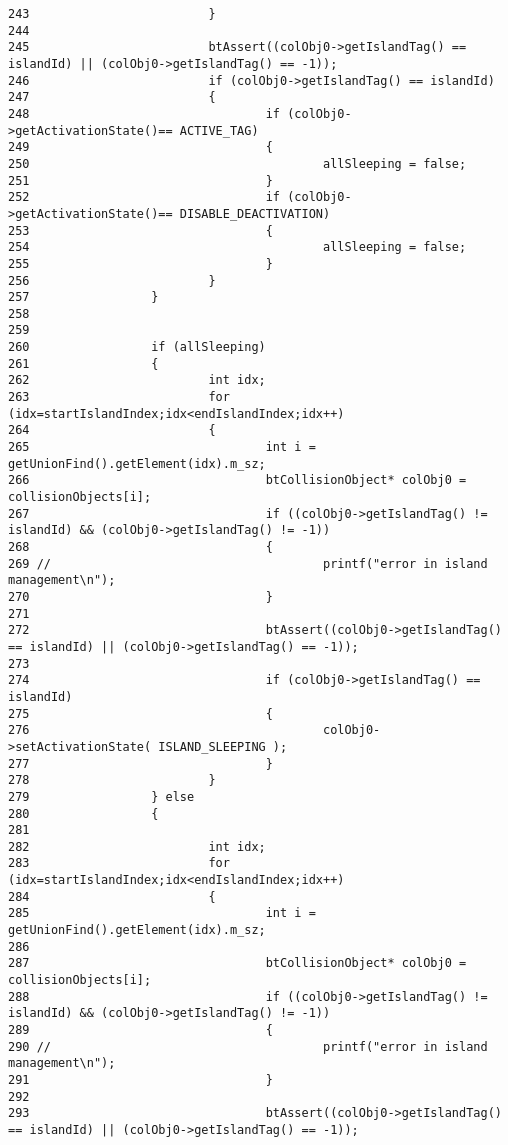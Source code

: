 \begin{Code}
\begin{verbatim}
243                         }
244 
245                         btAssert((colObj0->getIslandTag() == islandId) || (colObj0->getIslandTag() == -1));
246                         if (colObj0->getIslandTag() == islandId)
247                         {
248                                 if (colObj0->getActivationState()== ACTIVE_TAG)
249                                 {
250                                         allSleeping = false;
251                                 }
252                                 if (colObj0->getActivationState()== DISABLE_DEACTIVATION)
253                                 {
254                                         allSleeping = false;
255                                 }
256                         }
257                 }
258                         
259 
260                 if (allSleeping)
261                 {
262                         int idx;
263                         for (idx=startIslandIndex;idx<endIslandIndex;idx++)
264                         {
265                                 int i = getUnionFind().getElement(idx).m_sz;
266                                 btCollisionObject* colObj0 = collisionObjects[i];
267                                 if ((colObj0->getIslandTag() != islandId) && (colObj0->getIslandTag() != -1))
268                                 {
269 //                                      printf("error in island management\n");
270                                 }
271 
272                                 btAssert((colObj0->getIslandTag() == islandId) || (colObj0->getIslandTag() == -1));
273 
274                                 if (colObj0->getIslandTag() == islandId)
275                                 {
276                                         colObj0->setActivationState( ISLAND_SLEEPING );
277                                 }
278                         }
279                 } else
280                 {
281 
282                         int idx;
283                         for (idx=startIslandIndex;idx<endIslandIndex;idx++)
284                         {
285                                 int i = getUnionFind().getElement(idx).m_sz;
286 
287                                 btCollisionObject* colObj0 = collisionObjects[i];
288                                 if ((colObj0->getIslandTag() != islandId) && (colObj0->getIslandTag() != -1))
289                                 {
290 //                                      printf("error in island management\n");
291                                 }
292 
293                                 btAssert((colObj0->getIslandTag() == islandId) || (colObj0->getIslandTag() == -1));

\end{verbatim}
\end{Code}
